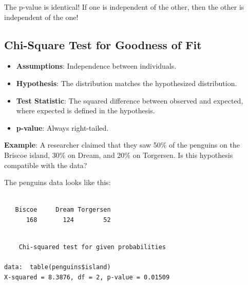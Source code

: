 \documentclass[
  letterpaper,
  DIV=11,
  numbers=noendperiod,
  oneside]{scrreprt}
\newenvironment{Shaded}{\begin{snugshade}}{\end{snugshade}}
\newcommand{\AttributeTok}[1]{\textcolor[rgb]{0.40,0.45,0.13}{#1}}
\newcommand{\FloatTok}[1]{\textcolor[rgb]{0.68,0.00,0.00}{#1}}
\newcommand{\FunctionTok}[1]{\textcolor[rgb]{0.28,0.35,0.67}{#1}}
\newcommand{\NormalTok}[1]{\textcolor[rgb]{0.00,0.23,0.31}{#1}}
\newcommand{\SpecialCharTok}[1]{\textcolor[rgb]{0.37,0.37,0.37}{#1}}
\providecommand{\tightlist}{%
  \setlength{\itemsep}{0pt}\setlength{\parskip}{0pt}}\usepackage{longtable,booktabs,array}
\begin{document}
The p-value is identical! If one is independent of the other, then the
other is independent of the one!

\hypertarget{chi-square-test-for-goodness-of-fit}{%
\subsection{Chi-Square Test for Goodness of
Fit}\label{chi-square-test-for-goodness-of-fit}}

\begin{itemize}
\tightlist
\item
  \textbf{Assumptions}: Independence between individuals.
\item
  \textbf{Hypothesis}: The distribution matches the hypothesized
  distribution.
\item
  \textbf{Test Statistic}: The squared difference between observed and
  expected, where expected is defined in the hypothesis.
\item
  \textbf{p-value}: Always right-tailed.
\end{itemize}

\textbf{Example}: A researcher claimed that they saw 50\% of the
penguins on the Briscoe island, 30\% on Dream, and 20\% on Torgersen. Is
this hypothesis compatible with the data?

The penguins data looks like this:

\begin{Shaded}
\end{Shaded}

\begin{verbatim}

   Biscoe     Dream Torgersen 
      168       124        52 
\end{verbatim}

\begin{Shaded}
\end{Shaded}

\begin{verbatim}

    Chi-squared test for given probabilities

data:  table(penguins$island)
X-squared = 8.3876, df = 2, p-value = 0.01509
\end{verbatim}
\end{document}
